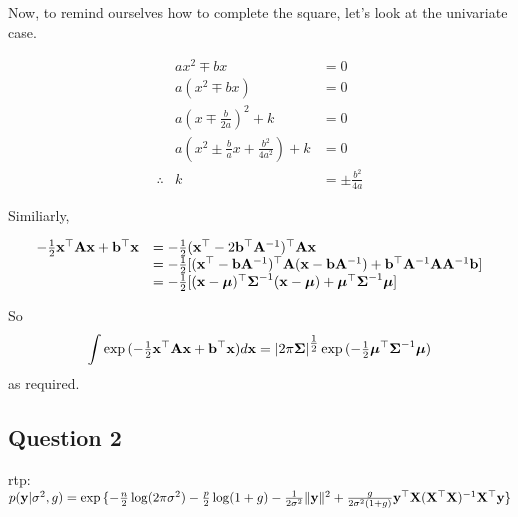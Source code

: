 \documentclass{amsart}[12pt]
\begin{document}
Now, to remind ourselves how to complete the square, let's look at the univariate case.

\begin{equation*}
	\begin{array}{rcl}
		           & ax^2 \mp bx                                     & = 0                  \\
		           & a(x^2 \mp bx)                                   & = 0                  \\
		           & a(x \mp \frac{b}{2a})^2 + k                     & = 0                  \\
		           & a(x^2 \pm \frac{b}{a} x + \frac{b^2}{4a^2}) + k & = 0                  \\
		\therefore & k                                               & = \pm \frac{b^2}{4a} 
	\end{array}
\end{equation*}

Similiarly,

\begin{equation*}
	\begin{array}{ll}
		-\tfrac{1}{2} {\bf x}^\top {\bf A} {\bf x} + {\bf b}^\top {\bf x} & = -\tfrac{1}{2}({\bf x}^\top -2{\bf b}^\top {\bf A}^{-1})^\top {\bf A} {\bf x}                                                     \\
		                                       & = -\tfrac{1}{2} [({\bf x}^\top - {\bf b} {\bf A}^{-1})^\top {\bf A} ({\bf x} - {\bf b} {\bf A}^{-1}) + {\bf b}^\top {\bf A}^{-1} {\bf A} {\bf A}^{-1} {\bf b}] \\
		                                       & = -\tfrac{1}{2} [({\bf x} - {\boldsymbol \mu})^\top {\boldsymbol\Sigma}^{-1} ({\bf x} - {\boldsymbol \mu}) + {\boldsymbol \mu}^\top {\boldsymbol\Sigma}^{-1} {\boldsymbol \mu}]                    
	\end{array}
\end{equation*}

So
\begin{equation*}
	\int \exp{(- \tfrac{1}{2} {\bf x}^\top {\bf A}{\bf x}+ {\bf b}^\top {\bf x})} d{\bf x} = |2 \pi {\boldsymbol\Sigma}|^{\tfrac{1}{2}} \exp{(- \tfrac{1}{2} {\boldsymbol\mu}^\top {\boldsymbol\Sigma}^{-1} {\boldsymbol\mu})}
\end{equation*}
as required.
\subsection{Question 2}

rtp: $p({\bf y} | \sigma^2, g) = \exp{\{ - \frac{n}{2} \log (2 \pi \sigma^2) - \frac{p}{2} \log(1 + g) - \frac{1}{2 \sigma^2} \| {\bf y}\|^2  + \frac{g}{2 \sigma^2 (1 + g)} {\bf y}^\top {\bf X}({\bf X}^\top {\bf X})^{-1} {\bf X}^\top {\bf y}\}}$
\end{document}
